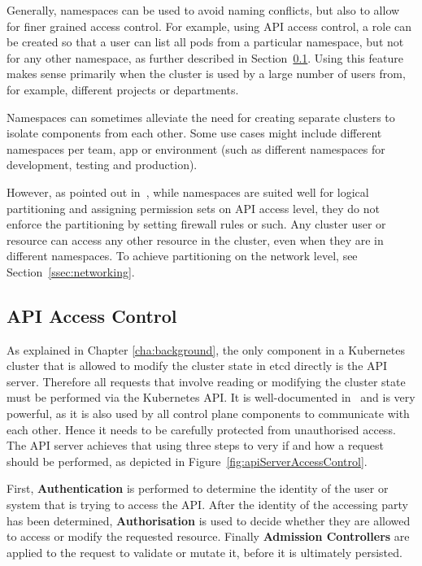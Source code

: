 Generally, namespaces can be used to avoid naming conflicts, but also to allow for finer grained access control. For example, using API access control, a role can be created so that a user can list all pods from a particular namespace, but not for any other namespace, as further described in Section~\ref{sec:apiAccessControl}. Using this feature makes sense primarily when the cluster is used by a large number of users from, for example, different projects or departments. 

Namespaces can sometimes alleviate the need for creating separate clusters to isolate components from each other. Some use cases might include different namespaces per team, app or environment (such as different namespaces for development, testing and production). 

However, as pointed out in~\textcite{namespacesInsights}, while namespaces are suited well for logical partitioning and assigning permission sets on API access level, they do not enforce the partitioning by setting firewall rules or such. Any cluster user or resource can access any other resource in the cluster, even when they are in different namespaces. To achieve partitioning on the network level, see Section~\ref{ssec:networking}.

\subsection{API Access Control} \label{sec:apiAccessControl}

As explained in Chapter \ref{cha:background}, the only component in a Kubernetes cluster that is allowed to modify the cluster state in etcd directly is the API server. Therefore all requests that involve reading or modifying the cluster state must be performed via the Kubernetes API. It is well-documented in~\textcite{k8sdocsApi} and is very powerful, as it is also used by all control plane components to communicate with each other. Hence it needs to be carefully protected from unauthorised access. The API server achieves that using three steps to very if and how a request should be performed, as depicted in Figure~\ref{fig:apiServerAccessControl}.


First, \textbf{Authentication} is performed to determine the identity of the user or system that is trying to access the API. After the identity of the accessing party has been determined, \textbf{Authorisation} is used to decide whether they are allowed to access or modify the requested resource. Finally \textbf{Admission Controllers} are applied to the request to validate or mutate it, before it is ultimately persisted.

